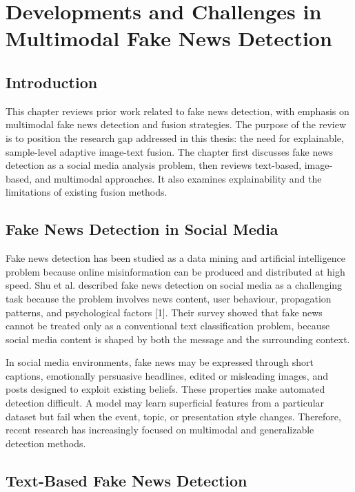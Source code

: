 \chapter{Developments and Challenges in Multimodal Fake News Detection}


\section{Introduction}


This chapter reviews prior work related to fake news detection, with emphasis on multimodal fake news detection and fusion strategies. The purpose of the review is to position the research gap addressed in this thesis: the need for explainable, sample-level adaptive image-text fusion. The chapter first discusses fake news detection as a social media analysis problem, then reviews text-based, image-based, and multimodal approaches. It also examines explainability and the limitations of existing fusion methods.


\section{Fake News Detection in Social Media}


Fake news detection has been studied as a data mining and artificial intelligence problem because online misinformation can be produced and distributed at high speed. Shu et al. described fake news detection on social media as a challenging task because the problem involves news content, user behaviour, propagation patterns, and psychological factors [1]. Their survey showed that fake news cannot be treated only as a conventional text classification problem, because social media content is shaped by both the message and the surrounding context.


In social media environments, fake news may be expressed through short captions, emotionally persuasive headlines, edited or misleading images, and posts designed to exploit existing beliefs. These properties make automated detection difficult. A model may learn superficial features from a particular dataset but fail when the event, topic, or presentation style changes. Therefore, recent research has increasingly focused on multimodal and generalizable detection methods.


\section{Text-Based Fake News Detection}


